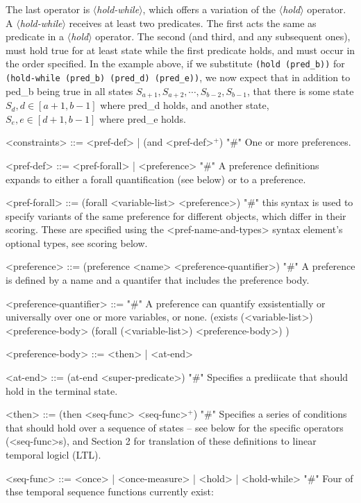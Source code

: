 \documentclass{article}
\newcommand{\dsl}[1]{{\it $\langle$#1$\rangle$}}
\begin{document}
The last operator is \dsl{hold-while}, which offers a variation of the \dsl{hold} operator.
A \dsl{hold-while} receives at least two predicates.
The first acts the same as predicate in a \dsl{hold} operator.
The second (and third, and any subsequent ones), must hold true for at least state while the first predicate holds, and must occur in the order specified.
In the example above, if we substitute \lstinline{(hold (pred_b))} for \lstinline{(hold-while (pred_b) (pred_d) (pred_e))}, we now expect that in addition to ped_b being true in all states $S_{a+1}, S_{a+2}, \cdots, S_{b-2}, S_{b-1}$, that there is some state $S_d, d \in [a+1, b-1]$ where pred_d holds, and another state, $S_e, e \in [d+1, b-1]$ where pred_e holds.

\begin{grammar}
<constraints> ::= <pref-def> | (and <pref-def>$^+$)  "#" One or more preferences.

<pref-def> ::= <pref-forall> | <preference> "#" A preference definitions expands to either a forall quantification (see below) or to a preference.

<pref-forall> ::= (forall <variable-list> <preference>) "#" this syntax is used to specify variants of the same preference for different objects, which differ in their scoring. These are specified using the <pref-name-and-types> syntax element's optional types, see scoring below.

<preference> ::= (preference <name> <preference-quantifier>) "#" A preference is defined by a name and a quantifer that includes the preference body.

<preference-quantifier> ::= "#" A preference can quantify exsistentially or universally over one or more variables, or none.
\alt (exists (<variable-list>) <preference-body>
\alt  (forall (<variable-list>) <preference-body>)
)

<preference-body> ::=  <then> | <at-end>

<at-end> ::= (at-end <super-predicate>) "#" Specifies a prediicate that should hold in the terminal state.

<then> ::= (then <seq-func> <seq-func>$^+$) "#" Specifies a series of conditions that should hold over a sequence of states -- see below for the specific operators (<seq-func>s), and Section 2 for translation of these definitions to linear temporal logicl (LTL).

<seq-func> ::= <once> | <once-measure> | <hold> | <hold-while> "#" Four of thse temporal sequence functions currently exist:


\end{grammar}
\end{document}
